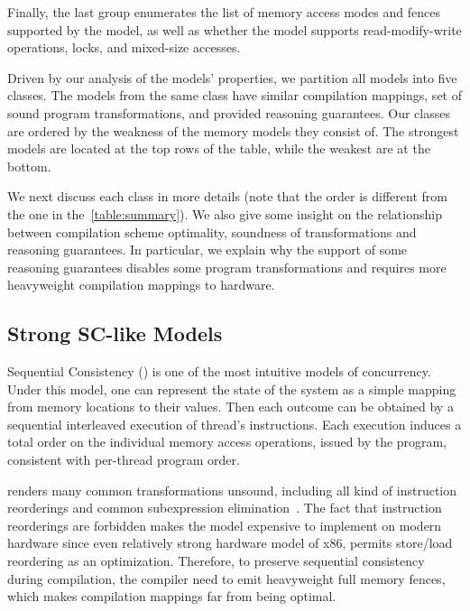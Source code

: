 Finally, the last group enumerates the list of memory access modes 
and fences supported by the model, as well as whether the model 
supports read-modify-write operations, locks, and mixed-size accesses.

Driven by our analysis of the models' properties, we partition all models into five classes. 
The models from the same class have similar compilation mappings, 
set of sound program transformations, and provided reasoning guarantees.
Our classes are ordered by the weakness of the memory models they consist of.  
The strongest models are located at the top rows of the table, 
while the weakest are at the bottom. 

We next discuss each class in more details
(note that the order is different from the one in the~\cref{table:summary}). 
We also give some insight on the relationship
between compilation scheme optimality, 
soundness of transformations and reasoning guarantees.
In particular, we explain why the support of some reasoning guarantees 
disables some program transformations and requires more heavyweight 
compilation mappings to hardware.

\subsection{Strong SC-like Models}

Sequential Consistency (\SC) is one of the most intuitive models of concurrency.
Under this model, one can represent the state of the system as 
a simple mapping from memory locations to their values. 
Then each outcome can be obtained by a sequential interleaved execution 
of thread's instructions. Each execution induces a total order 
on the individual memory access operations, issued by the program, 
consistent with per-thread program order. 

\SC renders many common transformations unsound, 
including all kind of instruction reorderings and 
common subexpression elimination~\cite{Marino-al:PLDI11, Sevcik-Aspinall:ECOOP08}.
The fact that instruction reorderings are forbidden 
makes the model expensive to implement on modern hardware
since even relatively strong hardware model of x86,
permits store/load reordering as an optimization.
Therefore, to preserve sequential consistency during compilation,
the compiler need to emit heavyweight full memory fences,
which makes compilation mappings far from being optimal.  

